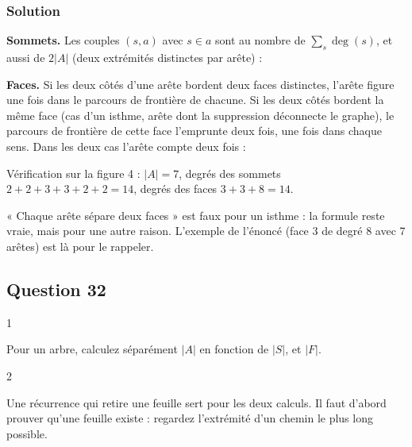 \documentclass[11pt,a4paper]{article}
\newcommand{\equationajustee}[1]{%
  \sbox{\boiteequation}{$\displaystyle #1$}%
  \ifdim\wd\boiteequation>\linewidth
    \[\resizebox{\linewidth}{!}{\usebox{\boiteequation}}\]%
  \else
    \[#1\]%
  \fi}
\begin{document}
\hypertarget{solution-30}{%
\subsubsection{Solution}\label{solution-30}}

\textbf{Sommets.} Les couples \((s, a)\) avec \(s \in a\) sont au nombre de \(\sum_s \deg(s)\), et aussi de \(2|A|\) (deux extrémités distinctes par arête) :

\equationajustee{\boxed{\,\sum_{s \in S} \deg(s) = 2|A|\,}}

\textbf{Faces.} Si les deux côtés d'une arête bordent deux faces distinctes, l'arête figure une fois dans le parcours de frontière de chacune. Si les deux côtés bordent la même face (cas d'un isthme, arête dont la suppression déconnecte le graphe), le parcours de frontière de cette face l'emprunte deux fois, une fois dans chaque sens. Dans les deux cas l'arête compte deux fois :

\equationajustee{\boxed{\,\sum_{f \in F} \deg(f) = 2|A|\,}}

Vérification sur la figure 4 : \(|A| = 7\), degrés des sommets \(2 + 2 + 3 + 3 + 2 + 2 = 14\), degrés des faces \(3 + 3 + 8 = 14\).

\begin{piege}

« Chaque arête sépare deux faces » est faux pour un isthme : la formule reste vraie, mais pour une autre raison. L'exemple de l'énoncé (face 3 de degré 8 avec 7 arêtes) est là pour le rappeler.

\end{piege}

\hypertarget{question-32}{%
\subsection{Question 32}\label{question-32}}

\begin{indication}{1}

Pour un arbre, calculez séparément \(|A|\) en fonction de \(|S|\), et \(|F|\).

\end{indication}

\begin{indication}{2}

Une récurrence qui retire une feuille sert pour les deux calculs. Il faut d'abord prouver qu'une feuille existe : regardez l'extrémité d'un chemin le plus long possible.

\end{indication}
\end{document}
